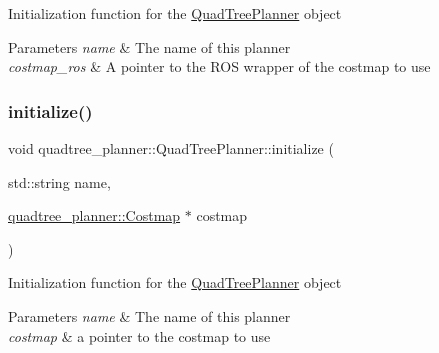 Initialization function for the \hyperlink{classquadtree__planner_1_1QuadTreePlanner}{Quad\+Tree\+Planner} object 
\begin{DoxyParams}{Parameters}
{\em name} & The name of this planner \\
\hline
{\em costmap\+\_\+ros} & A pointer to the R\+OS wrapper of the costmap to use \\
\hline
\end{DoxyParams}
\mbox{\label{classquadtree__planner_1_1QuadTreePlanner_a6bc83db035560028672f572a985d05b7}} 
\subsubsection{\texorpdfstring{initialize()}{initialize()}\hspace{0.1cm}{\footnotesize\ttfamily [2/2]}}
{\footnotesize\ttfamily void quadtree\+\_\+planner\+::\+Quad\+Tree\+Planner\+::initialize (\begin{DoxyParamCaption}\item[{std\+::string}]{name,  }\item[{\hyperlink{classquadtree__planner_1_1Costmap}{quadtree\+\_\+planner\+::\+Costmap} $\ast$}]{costmap }\end{DoxyParamCaption})}

Initialization function for the \hyperlink{classquadtree__planner_1_1QuadTreePlanner}{Quad\+Tree\+Planner} object 
\begin{DoxyParams}{Parameters}
{\em name} & The name of this planner \\
\hline
{\em costmap} & a pointer to the costmap to use \\
\hline
\end{DoxyParams}
\mbox{\label{classquadtree__planner_1_1QuadTreePlanner_a65ced31e9ea72cbee760f593f47115cd}} 
